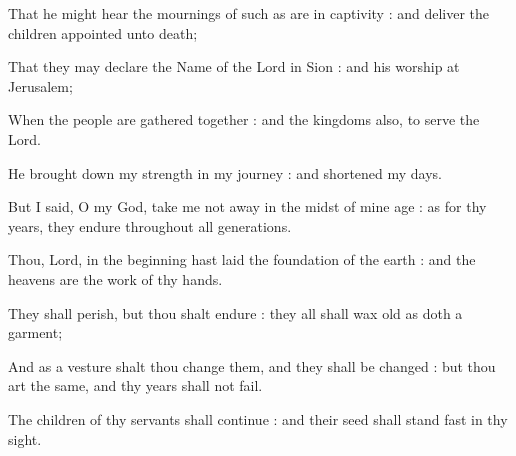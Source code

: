 That he might hear the mournings of such as are in captivity : and deliver the children appointed unto death;\par
{}That they may declare the Name of the Lord in Sion : and his worship at Jerusalem;\par
{}When the people are gathered together : and the kingdoms also, to serve the Lord.\par
{}He brought down my strength in my journey : and shortened my days.\par
{}But I said, O my God, take me not away in the midst of mine age : as for thy years, they endure throughout all generations.\par
{}Thou, Lord, in the beginning hast laid the foundation of the earth : and the heavens are the work of thy hands.\par
{}They shall perish, but thou shalt endure : they all shall wax old as doth a garment;\par
{}And as a vesture shalt thou change them, and they shall be changed : but thou art the same, and thy years shall not fail.\par
{}The children of thy servants shall continue : and their seed shall stand fast in thy sight.\par


